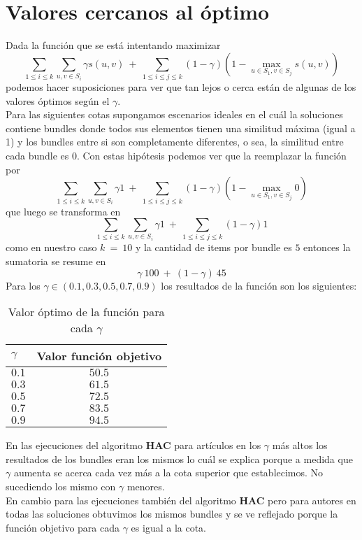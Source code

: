 \section{Valores cercanos al óptimo}
Dada la función que se está intentando maximizar $$\displaystyle\sum_{1 \leq i \leq k} 
\displaystyle\sum_{u,v \in S_{i}} \gamma s(u,v)\ 
+\ \displaystyle\sum_{1 \leq i \leq j \leq k} (1-\gamma) (1 - \displaystyle\max_{u \in S_{1}, v 
\in S_{j}} s(u,v))$$ podemos hacer suposiciones para ver que tan lejos o cerca están de algunas de 
los valores óptimos según el $\gamma$.\\
Para las siguientes cotas supongamos escenarios ideales en el cuál la soluciones contiene bundles 
donde todos sus elementos tienen una similitud máxima (igual a 1) y los bundles entre si son 
completamente diferentes, o sea, la similitud entre cada bundle es 0. Con estas hipótesis podemos 
ver que la reemplazar la función por $$\displaystyle\sum_{1 \leq i \leq k} 
\displaystyle\sum_{u,v \in S_{i}} \gamma 1\ 
+\ \displaystyle\sum_{1 \leq i \leq j \leq k} (1-\gamma) (1 - \displaystyle\max_{u \in S_{1}, v 
\in S_{j}} 0)$$ que luego se transforma en $$\displaystyle\sum_{1 \leq i \leq k} 
\displaystyle\sum_{u,v \in S_{i}} \gamma 1\ 
+\ \displaystyle\sum_{1 \leq i \leq j \leq k} (1-\gamma) 1$$ como en nuestro caso $k\ =\ 10$ y la 
cantidad de items por bundle es $5$ entonces la sumatoria se resume en $$\displaystyle\gamma\ 100\ 
+\ (1-\gamma)\ 45$$
Para los $\gamma \in (0.1, 0.3, 0.5, 0.7, 0.9)$ los resultados de la función son los siguientes:\\
\begin{table}[h]
  \centering
  \resizebox{0.5\textwidth}{!} {
    \begin{tabular}{|lc|}
    \hline
    $\gamma$ & Valor función objetivo \\
    \hline
    $0.1$  & $50.5$ \\
    $0.3$  & $61.5$ \\
    $0.5$  & $72.5$ \\
    $0.7$  & $83.5$ \\
    $0.9$  & $94.5$ \\
    \hline
    \end{tabular}
  }
    \caption {Valor óptimo de la función para cada $\gamma$}
\end{table}

En las ejecuciones del algoritmo \textbf{HAC} para artículos en los $\gamma$ más altos los 
resultados de los bundles eran los mismos lo cuál se explica porque a medida que $\gamma$ aumenta se 
acerca cada vez más a la cota superior que establecimos. No sucediendo los mismo con $\gamma$ 
menores.\\
En cambio para las ejecuciones también del algoritmo \textbf{HAC} pero para autores en todas las 
soluciones obtuvimos los mismos bundles y se ve reflejado porque la función objetivo para cada 
$\gamma$ es igual a la cota.